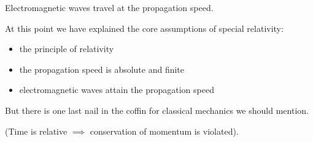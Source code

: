 \documentclass{article}
\begin{document}
\begin{axiom}
	Electromagnetic waves travel at the propagation speed.
\end{axiom}

At this point we have explained the core assumptions of special relativity:

\begin{itemize}
	\item the principle of relativity
	\item the propagation speed is absolute and finite
	\item electromagnetic waves attain the propagation speed
\end{itemize}

But there is one last nail in the coffin for classical mechanics we should mention.

\begin{theorem}
	(Time is relative $\implies$ conservation of momentum is violated).
\end{theorem}
\end{document}
